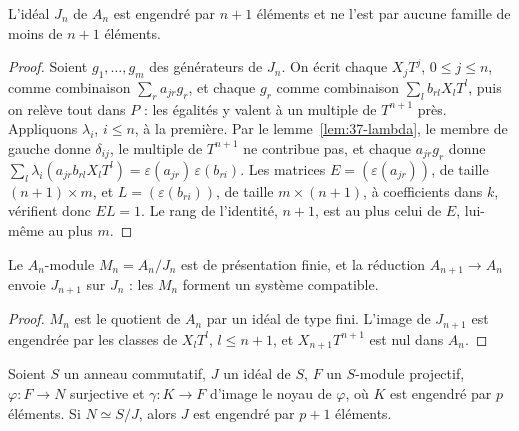 \begin{encadre}
\begin{theoreme}\label{thm:37-minimal}
L'idéal $J_n$ de $A_n$ est engendré par $n + 1$ éléments et ne l'est par aucune famille de moins de $n + 1$ éléments.
\end{theoreme}
\end{encadre}

\begin{proof}
Soient $g_1, \ldots, g_m$ des générateurs de $J_n$. On écrit chaque $X_jT^j$, $0 \leq j \leq n$, comme combinaison $\sum_r a_{jr}g_r$, et chaque $g_r$ comme combinaison $\sum_l b_{rl}X_lT^l$, puis on relève tout dans $P$ : les égalités y valent à un multiple de $T^{n+1}$ près. Appliquons $\lambda_i$, $i \leq n$, à la première. Par le lemme~\ref{lem:37-lambda}, le membre de gauche donne $\delta_{ij}$, le multiple de $T^{n+1}$ ne contribue pas, et chaque $a_{jr}g_r$ donne $\sum_l \lambda_i(a_{jr}b_{rl}X_lT^l) = \varepsilon(a_{jr})\,\varepsilon(b_{ri})$. Les matrices $E = (\varepsilon(a_{jr}))$, de taille $(n+1) \times m$, et $L = (\varepsilon(b_{ri}))$, de taille $m \times (n+1)$, à coefficients dans $k$, vérifient donc $EL = 1$. Le rang de l'identité, $n + 1$, est au plus celui de $E$, lui-même au plus $m$.
\end{proof}

\begin{enonce}\label{prop:37-compat}
Le $A_n$-module $M_n = A_n/J_n$ est de présentation finie, et la réduction $A_{n+1} \to A_n$ envoie $J_{n+1}$ sur $J_n$ : les $M_n$ forment un système compatible.
\end{enonce}

\begin{proof}
$M_n$ est le quotient de $A_n$ par un idéal de type fini. L'image de $J_{n+1}$ est engendrée par les classes de $X_lT^l$, $l \leq n + 1$, et $X_{n+1}T^{n+1}$ est nul dans $A_n$.
\end{proof}

\begin{lemme}\label{lem:37-schanuel}
Soient $S$ un anneau commutatif, $J$ un idéal de $S$, $F$ un $S$-module projectif, $\varphi : F \to N$ surjective et $\gamma : K \to F$ d'image le noyau de $\varphi$, où $K$ est engendré par $p$ éléments. Si $N \simeq S/J$, alors $J$ est engendré par $p + 1$ éléments.
\end{lemme}

